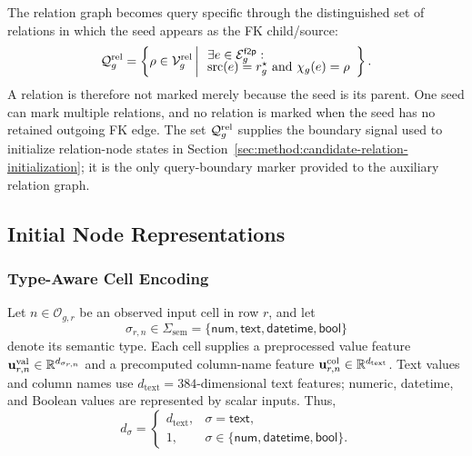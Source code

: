 The relation graph becomes query specific through the distinguished set of
relations in which the seed appears as the FK child/source:
\begin{equation}
  \mathcal Q_g^{\mathrm{rel}}
  =
  \left\{
    \rho\in\mathcal V_g^{\mathrm{rel}}
    \,\middle|\,
    \begin{array}{l}
      \exists e\in\mathcal E_g^{\mathsf{f2p}}:\\[-1mm]
      \operatorname{src}(e)=r_g^\star\ \text{and}\ \chi_g(e)=\rho
    \end{array}
  \right\}.
\label{eq:method:query-relation-set}
\end{equation}
A relation is therefore not marked merely because the seed is its parent.
One seed can mark multiple relations, and no relation is marked when the
seed has no retained outgoing FK edge.
The set \(\mathcal Q_g^{\mathrm{rel}}\) supplies the boundary signal used to
initialize relation-node states in
Section~\ref{sec:method:candidate-relation-initialization}; it is the only
query-boundary marker provided to the auxiliary relation graph.

\subsection{Initial Node Representations}
\label{sec:method:node-initialization}

\subsubsection{Type-Aware Cell Encoding}
\label{sec:method:cell-encoding}

Let \(n\in\mathcal O_{g,r}\) be an observed input cell in row \(r\), and
let
\begin{equation}
  \sigma_{r,n}
  \in
  \Sigma_{\mathrm{sem}}
  =
  \{\mathsf{num},\mathsf{text},\mathsf{datetime},\mathsf{bool}\}
\label{eq:method:semantic-types}
\end{equation}
denote its semantic type. Each cell supplies a preprocessed value feature
\(\mathbf u_{r,n}^{\mathrm{val}}\in\mathbb{R}^{d_{\sigma_{r,n}}}\) and a
precomputed column-name feature
\(\mathbf u_{r,n}^{\mathrm{col}}\in\mathbb{R}^{d_{\mathrm{text}}}\). Text values
and column names use \(d_{\mathrm{text}}=384\)-dimensional text features;
numeric, datetime, and Boolean values are represented by scalar inputs.
Thus,
\begin{equation}
  d_\sigma
  =
  \begin{cases}
    d_{\mathrm{text}}, & \sigma=\mathsf{text},\\
    1, & \sigma\in\{\mathsf{num},\mathsf{datetime},\mathsf{bool}\}.
  \end{cases}
\label{eq:method:value-input-dimensions}
\end{equation}

